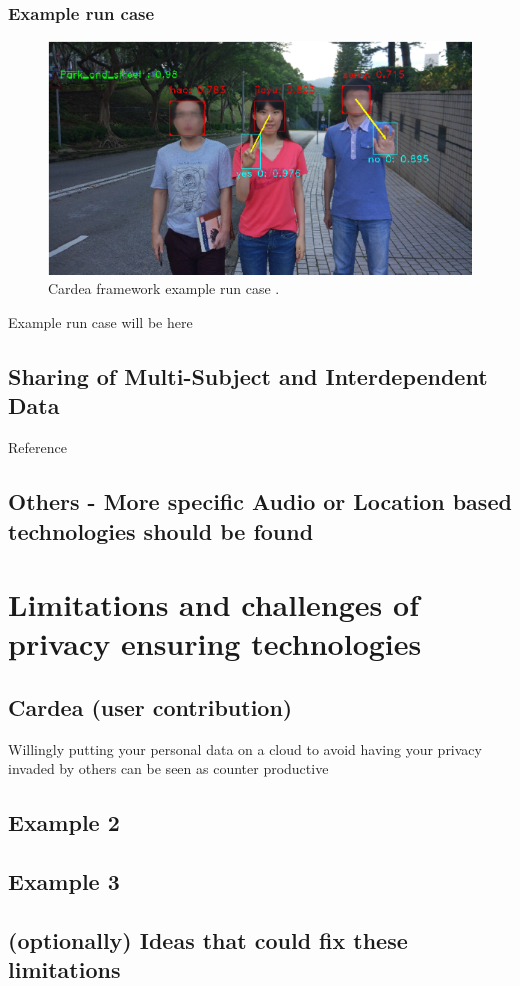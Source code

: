 \documentclass[conference]{IEEEtran}
\begin{document}
\subsubsection{Example run case}
\begin{figure}[t]
\centerline{\includegraphics[width=.5\textwidth]{img/cardea_example.png}}
\caption{Cardea framework example run case \cite{shu2016cardea}.}
\label{fig:cardea}
\end{figure}

Example run case will be here 



\subsection{Sharing of Multi-Subject and Interdependent Data}
Reference \cite{olteanu2018consensual}


\subsection{Others - More specific Audio or Location based technologies should be found}


\section{Limitations and challenges of privacy ensuring technologies}\label{Limitations}
\subsection{Cardea (user contribution)}
Willingly putting your personal data on a cloud to avoid having your privacy invaded by others can be seen as counter productive
\subsection{Example 2}
\subsection{Example 3}
\subsection{(optionally) Ideas that could fix these limitations}
\end{document}
